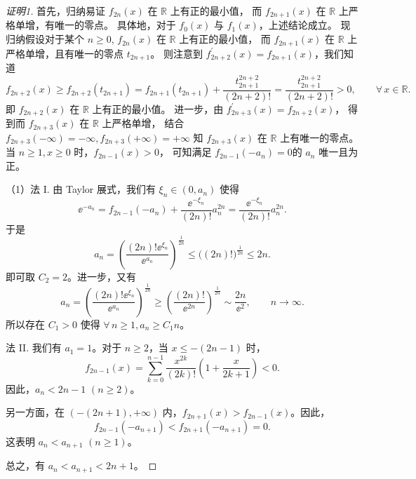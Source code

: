 \begin{quizb}
\begin{enumerate}
\begin{proof}[证明1]
首先，归纳易证 $f_{2n}(x)$ 在 $\mathbb{R}$ 上有正的最小值，
而 $f_{2n+1}(x)$ 在 $\mathbb{R}$ 上严格单增，有唯一的零点。
具体地，对于 $f_{0}(x)$ 与 $f_{1}(x)$，上述结论成立。
现归纳假设对于某个 $n \geqslant 0$, $f_{2n}(x)$ 在 $\mathbb{R}$ 上有正的最小值，
而 $f_{2n+1}(x)$ 在 $\mathbb{R}$ 上严格单增，且有唯一的零点 $t_{2n+1}$。
则注意到 $f_{2n+2}^{\prime}(x)=f_{2n+1}(x)$，我们知道
$$f_{2n+2}(x) \geqslant f_{2n+2}(t_{2n+1})
=f_{2n+1}(t_{2n+1})+\frac{t_{2n+1}^{2n+2}}{(2n+2)!}
=\frac{t_{2n+1}^{2n+2}}{(2n+2)!}>0, \qquad \forall\, x \in \mathbb{R}.$$
即 $f_{2n+2}(x)$ 在 $\mathbb{R}$ 上有正的最小值。
进一步，由 $f_{2n+3}^{\prime}(x)=f_{2n+2}(x)$，
得到而 $f_{2n+3}(x)$ 在 $\mathbb{R}$ 上严格单增，
结合 $f_{2n+3}(-\infty)=-\infty, f_{2n+3}(+\infty)=+\infty$ 
知 $f_{2n+3}(x)$ 在 $\mathbb{R}$ 上有唯一的零点。
当 $n \geqslant 1, x \geqslant 0$ 时，$f_{2n-1}(x)>0$，
可知满足 $f_{2n-1}(-a_{n})=0$的 $a_{n}$ 唯一且为正。

（1）法 I. 由 Taylor 展式，我们有 $\xi_{n} \in (0, a_{n})$ 使得
$$\ee^{-a_{n}}=f_{2n-1}(-a_{n})+\frac{\ee^{-\xi_{n}}}{(2n)!} a_{n}^{2n}
=\frac{\ee^{-\xi_{n}}}{(2n)!} a_{n}^{2n}.$$
于是
$$a_{n}=\left(\frac{(2n)!\ee^{\xi_{n}}}{\ee^{a_{n}}}\right)^{\frac{1}{2n}} 
\leqslant\big((2n)!\big)^{\frac{1}{2n}} \leqslant 2n.$$
即可取 $C_{2}=2$。进一步，又有
$$a_{n}=\left(\frac{(2n)!\ee^{\xi_{n}}}{\ee^{a_{n}}}\right)^{\frac{1}{2n}} 
\geqslant\left(\frac{(2n)!}{\ee^{2n}}\right)^{\frac{1}{2n}} 
\sim \frac{2n}{\ee^{2}}, \qquad n \rightarrow \infty.$$
所以存在 $C_{1}>0$ 使得 $\forall\, n \geqslant 1, a_{n} \geqslant C_{1} n$。

法 II. 我们有 $a_{1}=1$。对于 $n \geqslant 2$，当 $x \leqslant -(2n-1)$ 时，
$$f_{2n-1}(x)=\sum_{k=0}^{n-1} \frac{x^{2k}}{(2k)!}\left(1+\frac{x}{2k+1}\right)<0.$$
因此，$a_{n}<2n-1$ $(n \geqslant 2)$。

另一方面，在 $(-(2n+1),+\infty)$ 内，$f_{2n+1}(x)>f_{2n-1}(x)$。因此，
$$f_{2n-1}(-a_{n+1})<f_{2n+1}(-a_{n+1})=0.$$
这表明 $a_{n}<a_{n+1}$ $(n \geqslant 1)$。

总之，有 $a_{n}<a_{n+1}<2n+1$。


\end{proof}
\end{enumerate}
\end{quizb}
